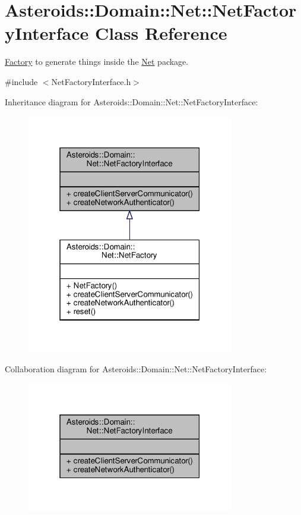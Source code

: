 \hypertarget{classAsteroids_1_1Domain_1_1Net_1_1NetFactoryInterface}{}\section{Asteroids\+:\+:Domain\+:\+:Net\+:\+:Net\+Factory\+Interface Class Reference}
\label{classAsteroids_1_1Domain_1_1Net_1_1NetFactoryInterface}


\hyperlink{namespaceAsteroids_1_1Domain_1_1Factory}{Factory} to generate things inside the \hyperlink{namespaceAsteroids_1_1Domain_1_1Net}{Net} package.  




{\ttfamily \#include $<$Net\+Factory\+Interface.\+h$>$}



Inheritance diagram for Asteroids\+:\+:Domain\+:\+:Net\+:\+:Net\+Factory\+Interface\+:\nopagebreak
\begin{figure}[H]
\begin{center}
\leavevmode
\includegraphics[width=256pt]{classAsteroids_1_1Domain_1_1Net_1_1NetFactoryInterface__inherit__graph}
\end{center}
\end{figure}


Collaboration diagram for Asteroids\+:\+:Domain\+:\+:Net\+:\+:Net\+Factory\+Interface\+:\nopagebreak
\begin{figure}[H]
\begin{center}
\leavevmode
\includegraphics[width=256pt]{classAsteroids_1_1Domain_1_1Net_1_1NetFactoryInterface__coll__graph}
\end{center}
\end{figure}
